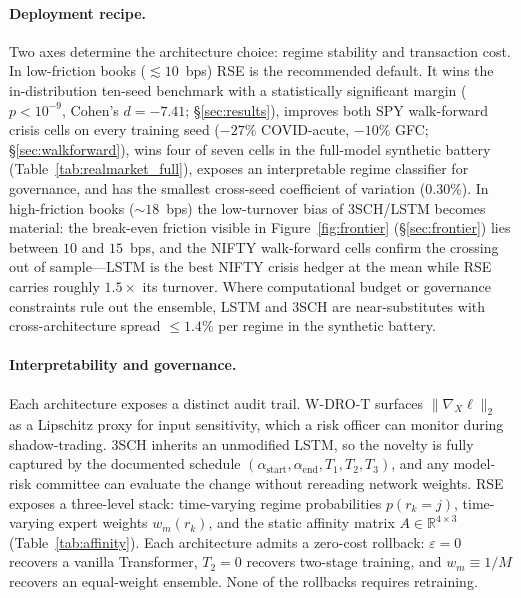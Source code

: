 \documentclass[10pt,letterpaper]{article}
\newcommand{\R}{\mathbb{R}}
\begin{document}
\paragraph{Deployment recipe.}
Two axes determine the architecture choice: regime stability and
transaction cost. In low-friction books ($\lesssim\!10$~bps) RSE
is the recommended default. It wins the in-distribution ten-seed
benchmark with a statistically significant margin ($p < 10^{-9}$,
Cohen's $d=-7.41$; \S\ref{sec:results}), improves both SPY
walk-forward crisis cells on every training seed ($-27\%$
COVID-acute, $-10\%$ GFC; \S\ref{sec:walkforward}), wins four of
seven cells in the full-model synthetic battery
(Table~\ref{tab:realmarket_full}), exposes an interpretable regime classifier for
governance, and has the smallest cross-seed coefficient of
variation ($0.30\%$). In high-friction books ($\sim\!18$~bps) the
low-turnover bias of 3SCH/LSTM becomes material: the break-even
friction visible in Figure~\ref{fig:frontier} (\S\ref{sec:frontier})
lies between $10$ and $15$~bps, and the NIFTY walk-forward cells
confirm the crossing out of sample---LSTM is the best NIFTY
crisis hedger at the mean while RSE carries roughly $1.5\times$
its turnover. Where computational budget or
governance constraints rule out the ensemble, LSTM and 3SCH are
near-substitutes with cross-architecture spread $\le 1.4\%$ per
regime in the synthetic battery.

\paragraph{Interpretability and governance.}
Each architecture exposes a distinct audit trail. W-DRO-T surfaces
$\|\nabla_X\ell\|_2$ as a Lipschitz proxy for input sensitivity,
which a risk officer can monitor during shadow-trading. 3SCH
inherits an unmodified LSTM, so the novelty is fully captured by
the documented schedule
$(\alpha_{\mathrm{start}},\alpha_{\mathrm{end}},T_1,T_2,T_3)$, and
any model-risk committee can evaluate the change without rereading
network weights. RSE exposes a three-level stack: time-varying
regime probabilities $p(r_k=j)$, time-varying expert weights
$w_m(r_k)$, and the static affinity matrix
$A\in\R^{4\times 3}$ (Table~\ref{tab:affinity}). Each architecture
admits a zero-cost rollback: $\varepsilon\!=\!0$ recovers a vanilla
Transformer, $T_2\!=\!0$ recovers two-stage training, and
$w_m\!\equiv\!1/M$ recovers an equal-weight ensemble. None of the
rollbacks requires retraining.
\end{document}
